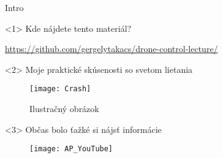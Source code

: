 \begin{frame}{Intro}

\begin{onlyenv}<1>
Kde nájdete tento materiál?
\begin{center}
{\LARGE \url{https://github.com/gergelytakacs/drone-control-lecture/}}
\end{center}
\end{onlyenv}

\begin{onlyenv}<2>
Moje praktické skúsenosti so svetom lietania
  \begin{figure}
\centering
  \texttt{[image: Crash]}\\
  \caption{Ilustračný obrázok}
\end{figure}
\end{onlyenv}


\begin{onlyenv}<3>
Občas bolo ťažké si nájsť informácie
  \begin{figure}
\centering
  \texttt{[image: AP\_YouTube]}\\
\end{figure}
\end{onlyenv}

\end{frame} 